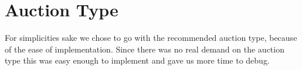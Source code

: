 \section{Auction Type}\label{sec:auction}
For simplicities sake we chose to go with the recommended auction type, because
of the ease of implementation. Since there was no real demand on the auction
type this was easy enough to implement and gave us more time to debug.
